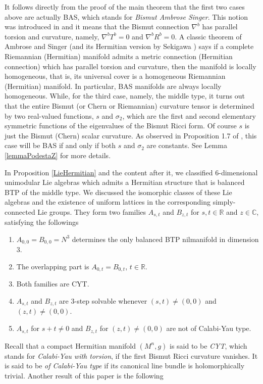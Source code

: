 \documentclass{amsart}
\numberwithin{equation}{section}
\theoremstyle{definition}
\renewcommand{\1}{\mathds{1}}
\renewcommand{\>}{\rightarrow}
\begin{document}
It follows directly from the proof of the main theorem that the first two cases above are actually BAS, which stands for \emph{Bismut Ambrose Singer}. This notion was introduced in \cite{NZ1, NZ} and it means that the Bismut connection $\nabla^b$ has parallel torsion and curvature, namely, $\nabla^b T^b =0$ and $\nabla^b R^b=0$. A classic theorem of Ambrose and Singer \cite{AS} (and its Hermitian version by Sekigawa \cite{Sekigawa})
says if a complete Riemannian (Hermitian) manifold admits a metric connection (Hermitian connection) which has parallel torsion and curvature, then the manifold is locally homogeneous, that is, its universal cover is a homogeneous Riemannian (Hermitian) manifold. In particular, BAS manifolds are always locally homogeneous. While, for the third case, namely, the middle type, it turns out that the entire Bismut (or Chern or Riemannian) curvature tensor is determined by two real-valued functions, $s$ and $\sigma_2$, which are the first and second elementary symmetric functions of the eigenvalues of the Bismut Ricci form. Of course $s$ is just the Bismut (Chern) scalar curvature.
As observed in Proposition 1.7 of \cite{PodestaZ}, this case will be BAS if and only if both $s$ and $\sigma_2$ are constants.
See Lemma \ref{lemmaPodestaZ} for more details.


In Proposition \ref{LieHermitian} and the content after it, we classified $6$-dimensional unimodular Lie algebras which admits a  Hermitian structure
that is balanced BTP of the middle type. We discussed the isomorphic classes of these Lie algebras and the existence of uniform lattices in the corresponding simply-connected Lie groups. They form two families $A_{s,t}$ and $B_{z,t}$ for $s,t\in {\mathbb R}$ and $z\in {\mathbb C}$,
satisfying the followings
\begin{enumerate}
\item  $A_{0,0}=B_{0,0}=N^3$ determines the only balanced BTP nilmanifold in dimension $3$.
\item The overlapping part is $A_{0,t}=B_{0,t}$, $t\in {\mathbb R}$.
\item Both families are CYT.
\item $A_{s,t}$ and $B_{z,t}$ are $3$-step solvable whenever $(s,t)\neq (0,0)$ and $(z,t)\neq (0,0)$.
\item $A_{s,t}$ for $s+t\neq 0$ and $B_{z,t}$ for $(z,t)\neq (0,0)$ are not of Calabi-Yau type.
\end{enumerate}

Recall that a compact Hermitian manifold $(M^n,g)$ is said to be {\em CYT}, which stands for {\em Calabi-Yau with torsion}, if the first Bismut Ricci curvature vanishes. It is said to be {\em of Calabi-Yau type} if its canonical line bundle is holomorphically trivial. Another result of this paper is the following
\end{document}
